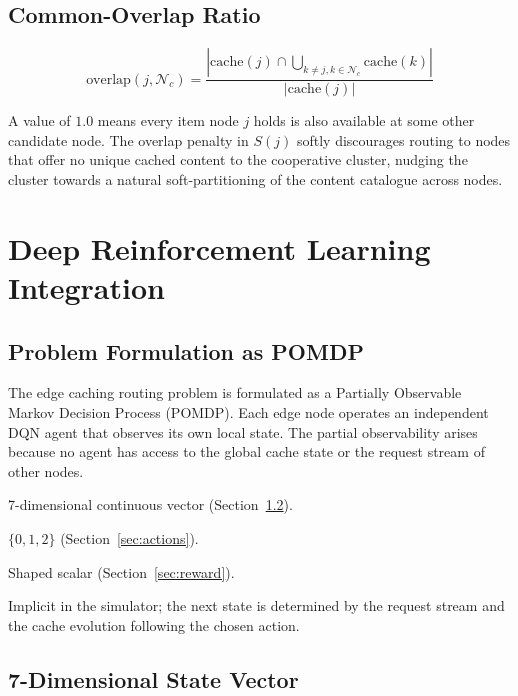 \documentclass[12pt]{article}
\begin{document}
\subsection{Common-Overlap Ratio}
\label{sec:overlap}

\begin{equation}
  \text{overlap}(j, \mathcal{N}_c) = \frac{|\text{cache}(j) \cap \bigcup_{k \neq j, k \in \mathcal{N}_c} \text{cache}(k)|}{|\text{cache}(j)|}
\end{equation}

A value of $1.0$ means every item node $j$ holds is also available at some other candidate node. The overlap penalty in $S(j)$ softly discourages routing to nodes that offer no unique cached content to the cooperative cluster, nudging the cluster towards a natural soft-partitioning of the content catalogue across nodes.

\section{Deep Reinforcement Learning Integration}
\label{sec:drl}

\subsection{Problem Formulation as POMDP}

The edge caching routing problem is formulated as a Partially Observable Markov Decision Process (POMDP). Each edge node operates an independent DQN agent that observes its own local state. The partial observability arises because no agent has access to the global cache state or the request stream of other nodes.

\begin{description}[noitemsep]
  \item[State space $\mathcal{S}$] 7-dimensional continuous vector (Section~\ref{sec:state}).
  \item[Action space $\mathcal{A}$] $\{0, 1, 2\}$ (Section~\ref{sec:actions}).
  \item[Reward $r$] Shaped scalar (Section~\ref{sec:reward}).
  \item[Transition] Implicit in the simulator; the next state is determined by the request stream and the cache evolution following the chosen action.
\end{description}

\subsection{7-Dimensional State Vector}
\label{sec:state}
\end{document}
